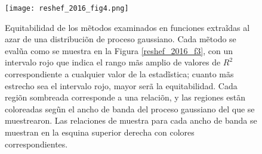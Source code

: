 	\begin{figure}[H] 
		\centering
		\texttt{[image: reshef\_2016\_fig4.png]}
		\caption{Equitabilidad de los m\~etodos examinados en funciones extra\~idas al azar de una distribuci\~on de proceso gaussiano. Cada m\~etodo se eval\~ua como se muestra en la Figura \ref{reshef_2016_f3}, con un intervalo rojo que indica el rango m\~as amplio de valores de $R^2$ correspondiente a cualquier valor de la estad\~istica; cuanto m\~as estrecho sea el intervalo rojo, mayor ser\~a la equitabilidad. Cada regi\~on sombreada corresponde a una relaci\~on, y las regiones est\~an coloreadas seg\~un el ancho de banda del proceso gaussiano del que se muestrearon. Las relaciones de muestra para cada ancho de banda se muestran en la esquina superior derecha con colores correspondientes.}
		\label{reshef_2016_f4}
	\end{figure}


